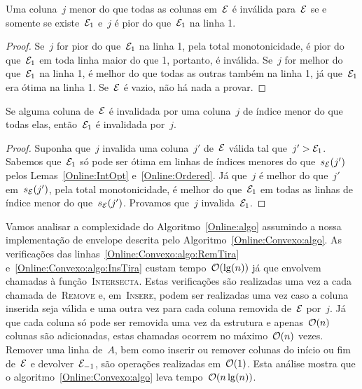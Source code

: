 \begin{prop} \label{Online:newInvalid}
Uma coluna~$j$ menor do que todas as colunas em~$\mathcal{E}$ é inválida para~$\mathcal{E}$ se e somente se existe~$\mathcal{E}_1$ e~$j$ é pior do que~$\mathcal{E}_1$ na linha 1.
\end{prop}

\begin{proof}
Se~$j$ for pior do que~$\mathcal{E}_1$ na linha 1, pela total monotonicidade, é pior do que~$\mathcal{E}_1$ em toda linha maior do que 1, portanto, é inválida. Se~$j$ for melhor do que~$\mathcal{E}_1$ na linha 1, é melhor do que todas as outras também na linha 1, já que~$\mathcal{E}_1$ era ótima na linha 1. Se~$\mathcal{E}$ é vazio, não há nada a provar.
\end{proof}

\begin{prop} \label{Online:oldInvalid}
Se alguma coluna de~$\mathcal{E}$ é invalidada por uma coluna~$j$ de índice menor do que todas elas, então~$\mathcal{E}_1$ é invalidada por~$j$.
\end{prop}

\begin{proof}
Suponha que~$j$ invalida uma coluna~$j'$ de~$\mathcal{E}$ válida tal que~$j' > \mathcal{E}_1$. Sabemos que~$\mathcal{E}_1$ só pode ser ótima em linhas de índices menores do que~$s_{\mathcal{E}}(j')$ pelos Lemas~\ref{Online:IntOpt} e~\ref{Online:Ordered}. Já que~$j$ é melhor do que~$j'$ em~$s_{\mathcal{E}}(j')$, pela total monotonicidade, é melhor do que~$\mathcal{E}_1$ em todas as linhas de índice menor do que~$s_{\mathcal{E}}(j')$. Provamos que~$j$ invalida~$\mathcal{E}_1$.
\end{proof}

Vamos analisar a complexidade do Algoritmo~\ref{Online:algo} assumindo a nossa implementação de envelope descrita pelo Algoritmo~\ref{Online:Convexo:algo}. As verificações das linhas~\ref{Online:Convexo:algo:RemTira} e~\ref{Online:Convexo:algo:InsTira} custam tempo~$\mathcal{O}(\lg(n))$ já que envolvem chamadas à função~\textsc{Intersecta}. Estas verificações são realizadas uma vez a cada chamada de~\textsc{Remove} e, em~\textsc{Insere}, podem ser realizadas uma vez caso a coluna inserida seja válida e uma outra vez para cada coluna removida de~$\mathcal{E}$ por~$j$. Já que cada coluna só pode ser removida uma vez da estrutura e apenas~$\mathcal{O}(n)$ colunas são adicionadas, estas chamadas ocorrem no máximo~$\mathcal{O}(n)$ vezes. Remover uma linha de~$A$, bem como inserir ou remover colunas do início ou fim de~$\mathcal{E}$ e devolver~$\mathcal{E}_{-1}$, são operações realizadas em~$\mathcal{O}(1)$. Esta análise mostra que o algoritmo~\ref{Online:Convexo:algo} leva tempo~$\mathcal{O}(n\lg(n))$.

